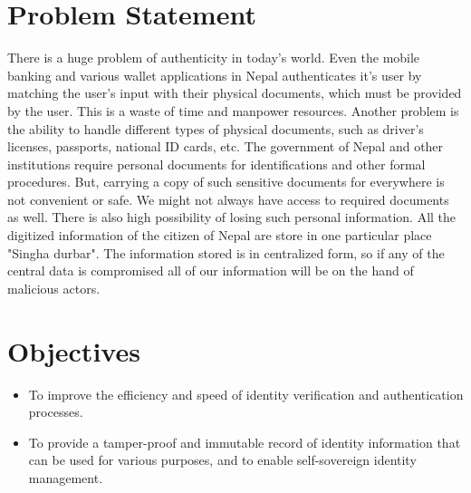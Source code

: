 \section{Problem Statement}
There is a huge problem of authenticity in today’s world. Even the mobile banking and various wallet applications in Nepal authenticates it’s user by matching the user’s input with their physical documents, which must be provided by the user. This is a waste of time and manpower resources. Another problem is the ability to handle different types of physical documents, such as driver's licenses, passports, national ID cards, etc.
The government of Nepal and other institutions require  personal documents for identifications and other formal procedures. But, carrying a copy of such sensitive documents for everywhere is not convenient or safe. We might not always have access to required documents as well. There is also high possibility of losing such personal information.
All the digitized information of the citizen of Nepal are store in one particular place "Singha durbar". The information stored is in centralized form, so if any of the central data is compromised all of our information will be on the hand of malicious actors. 

\section{Objectives}

 \begin{itemize}

    \item To improve the efficiency and speed of identity verification and authentication processes.
    \item To provide a tamper-proof and immutable record of identity information that can be used for various purposes, and to enable self-sovereign identity management.
   
\end{itemize}



